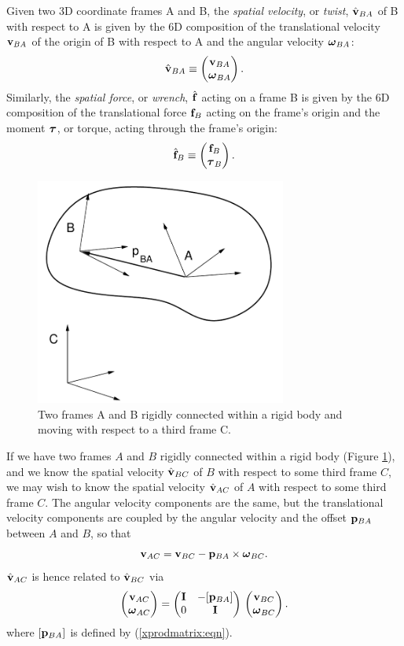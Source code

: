 Given two 3D coordinate frames A and B, the {\it spatial velocity},
or {\it twist},
$\hat{{\bf v}}_{BA}$ of B with respect to A is given by the 6D 
composition of the translational velocity ${\bf v}_{BA}$ of the
origin of B with respect to A and the angular velocity $\boldsymbol\omega_{BA}$:
%
\begin{equation}
\hat{{\bf v}}_{BA} \equiv \left(\begin{matrix} {\bf v}_{BA} \\ \boldsymbol\omega_{BA} \end{matrix}\right).
\end{equation}
%
Similarly, the {\it spatial force}, or {\it wrench}, $\hat{{\bf f}}$ acting
on a frame B is given by the 6D composition of the translational force
${\bf f}_B$ acting on the frame's origin and the moment $\boldsymbol\tau$, or torque,
acting through the frame's origin:
%
\begin{equation}
\hat{{\bf f}}_B \equiv \left(\begin{matrix} {\bf f}_B \\ \boldsymbol\tau_B \end{matrix}\right).
\end{equation}
%

\begin{figure}[h]
\begin{center}
 \includegraphics[width=3.25in]{images/rigidAB}
\end{center}
\caption{Two frames A and B rigidly connected within a rigid body
and moving with respect to a third frame C.}
\label{rigidAB:fig}
\end{figure}

If we have two frames $A$ and $B$ rigidly connected within a rigid
body (Figure \ref{rigidAB:fig}), and we know the spatial velocity
$\hat{{\bf v}}_{BC}$ of $B$ with respect to some third frame $C$, we may wish
to know the spatial velocity $\hat{{\bf v}}_{AC}$ of $A$ with respect to some
third frame $C$.  The angular velocity components are the same, but
the translational velocity components are coupled by the angular
velocity and the offset ${\bf p}_{BA}$ between $A$ and $B$, so that
%
\begin{equation*}
{\bf v}_{AC} = {\bf v}_{BC} - {\bf p}_{BA} \times \boldsymbol\omega_{BC}.
\end{equation*}
%
$\hat{{\bf v}}_{AC}$ is hence related to $\hat{{\bf v}}_{BC}$ via
\begin{equation*}
\left(\begin{matrix} {\bf v}_{AC} \\ \boldsymbol\omega_{AC} \end{matrix}\right) =
\left(\begin{matrix} {\bf I} & -[{\bf p}_{BA}] \\ 0 & {\bf I} \end{matrix}\right) \,
\left(\begin{matrix} {\bf v}_{BC} \\ \boldsymbol\omega_{BC} \end{matrix}\right).
\end{equation*}
%
where $[{\bf p}_{BA}]$ is defined by
(\ref{xprodmatrix:eqn}).

